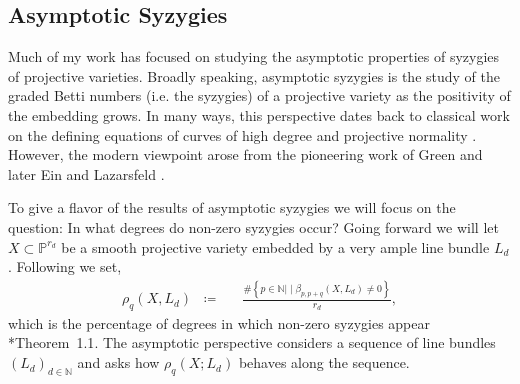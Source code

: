 \documentclass[11pt,reqno]{amsart}
\newtheorem{theorem}[lemma]{Theorem}
\theoremstyle{remark}
\newcommand{\N}{\mathbb{N}}
\renewcommand{\P}{\mathbb{P}}
\begin{document}

\subsection{Asymptotic Syzygies}

Much of my work has focused on studying the asymptotic properties of syzygies of projective varieties. Broadly speaking, asymptotic syzygies is the study of the graded Betti numbers (i.e. the syzygies) of a projective variety as the positivity of the embedding grows. In many ways, this perspective dates back to classical work on the defining equations of curves of high degree and projective normality \cite{mumford66, mumford70}. However, the modern viewpoint arose from the pioneering work of Green \cite{green84-I, green84-II} and later Ein and Lazarsfeld \cite{einLazarsfeld12}. 

To give a flavor of the results of asymptotic syzygies we will focus on the question: In what degrees do non-zero syzygies occur? Going forward we will let $X\subset \P^{r_{d}}$ be a smooth projective variety embedded by a very ample line bundle $L_{d}$. Following \cite{ermanYang18} we set, 
\begin{align*}
\rho_q\left(X,L_{d}\right)\;\;\coloneqq&\ \;\; \frac{\#\left\{p\in\N |\; \big| \; \beta_{p,p+q}\left(X,L_{d}\right)\neq0\right\}}{r_{d}},
\end{align*}
which is the percentage of degrees in which non-zero syzygies appear \cite{eisenbud05}*{Theorem~1.1}. The asymptotic perspective considers a sequence of line bundles $(L_{d})_{d\in \N}$ and asks how $\rho_{q}(X;L_{d})$ behaves along the sequence. 
\end{document}
